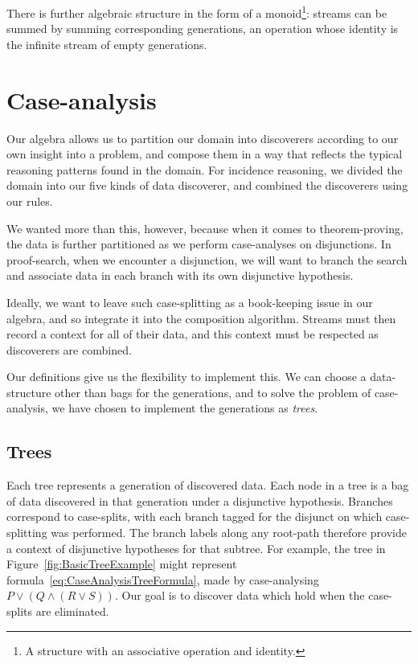 There is further algebraic structure in the form of a monoid\footnote{A structure with an associative operation and identity.}: streams can be summed by summing corresponding generations, an operation whose identity is the infinite stream of empty generations. 

\section{Case-analysis}
Our algebra allows us to partition our domain into discoverers according to our own insight into a problem, and compose them in a way that reflects the typical reasoning patterns found in the domain. For incidence reasoning, we divided the domain into our five kinds of data discoverer, and combined the discoverers using our rules.

We wanted more than this, however, because when it comes to theorem-proving, the data is further partitioned as we perform case-analyses on disjunctions. In proof-search, when we encounter a disjunction, we will want to branch the search and associate data in each branch with its own disjunctive hypothesis. 

Ideally, we want to leave such case-splitting as a book-keeping issue in our algebra, and so integrate it into the composition algorithm. Streams must then record a context for all of their data, and this context must be respected as discoverers are combined. 

Our definitions give us the flexibility to implement this. We can choose a data-structure other than bags for the generations, and to solve the problem of case-analysis, we have chosen to implement the generations as \emph{trees}. 

\subsection{Trees}\label{sec:Trees}
Each tree represents a generation of discovered data. Each node in a tree is a bag of data discovered in that generation under a disjunctive hypothesis. Branches correspond to case-splits, with each branch tagged for the disjunct on which case-splitting was performed. The branch labels along any root-path therefore provide a context of disjunctive hypotheses for that subtree. For example, the tree in Figure~\ref{fig:BasicTreeExample} might represent formula~\ref{eq:CaseAnalysisTreeFormula}, made by case-analysing \mbox{$P \vee (Q \wedge (R \vee S))$}. Our goal is to discover data which hold when the case-splits are eliminated.

